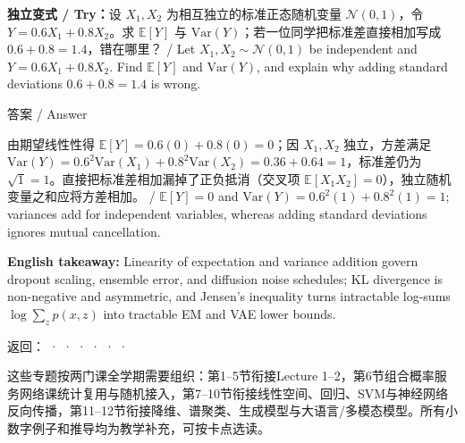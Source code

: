 \textbf{独立变式 / Try：}设 \(X_1, X_2\) 为相互独立的标准正态随机变量 \(\mathcal{N}(0, 1)\)，令 \(Y = 0.6 X_1 + 0.8 X_2\)。求 \(\mathbb{E}[Y]\) 与 \(\mathrm{Var}(Y)\)；若一位同学把标准差直接相加写成 \(0.6 + 0.8 = 1.4\)，错在哪里？ / Let \(X_1, X_2 \sim \mathcal{N}(0,1)\) be independent and \(Y = 0.6 X_1 + 0.8 X_2\). Find \(\mathbb{E}[Y]\) and \(\mathrm{Var}(Y)\), and explain why adding standard deviations \(0.6 + 0.8 = 1.4\) is wrong.



\begin{StudySolution}{答案 / Answer}


由期望线性性得 \(\mathbb{E}[Y] = 0.6(0) + 0.8(0) = 0\)；因 \(X_1, X_2\) 独立，方差满足 \(\mathrm{Var}(Y) = 0.6^2\mathrm{Var}(X_1) + 0.8^2\mathrm{Var}(X_2) = 0.36 + 0.64 = 1\)，标准差仍为 \(\sqrt{1} = 1\)。直接把标准差相加漏掉了正负抵消（交叉项 \(\mathbb{E}[X_1 X_2] = 0\)），独立随机变量之和应将方差相加。 / \(\mathbb{E}[Y] = 0\) and \(\mathrm{Var}(Y) = 0.6^2(1) + 0.8^2(1) = 1\); variances add for independent variables, whereas adding standard deviations ignores mutual cancellation.


\end{StudySolution}


\textbf{English takeaway:} Linearity of expectation and variance addition govern dropout scaling, ensemble error, and diffusion noise schedules; KL divergence is non-negative and asymmetric, and Jensen's inequality turns intractable log-sums \(\log \sum_z p(x,z)\) into tractable EM and VAE lower bounds.


返回： ·  ·  ·  ·  ·  · 








这些专题按两门课全学期需要组织：第1–5节衔接Lecture 1–2，第6节组合概率服务网络课统计复用与随机接入，第7–10节衔接线性空间、回归、SVM与神经网络反向传播，第11–12节衔接降维、谱聚类、生成模型与大语言/多模态模型。所有小数字例子和推导均为教学补充，可按卡点选读。


